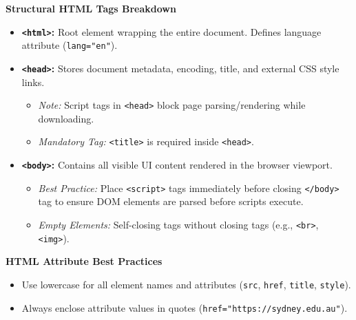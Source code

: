 \documentclass[8pt, a4paper]{article}
\begin{document}
\begin{conceptbox}
\textbf{Structural HTML Tags Breakdown}
\begin{itemize}
  \item \textbf{\texttt{<html>}:} Root element wrapping the entire document. Defines language attribute (\texttt{lang="en"}).
  \item \textbf{\texttt{<head>}:} Stores document metadata, encoding, title, and external CSS style links.
    \begin{itemize}
      \item \textit{Note:} Script tags in \texttt{<head>} block page parsing/rendering while downloading.
      \item \textit{Mandatory Tag:} \texttt{<title>} is required inside \texttt{<head>}.
    \end{itemize}
  \item \textbf{\texttt{<body>}:} Contains all visible UI content rendered in the browser viewport.
    \begin{itemize}
      \item \textit{Best Practice:} Place \texttt{<script>} tags immediately before closing \texttt{</body>} tag to
            ensure DOM elements are parsed before scripts execute.
      \item \textit{Empty Elements:} Self-closing tags without closing tags (e.g., \texttt{<br>}, \texttt{<img>}).
    \end{itemize}
\end{itemize}

\smallskip
\textbf{HTML Attribute Best Practices}
\begin{itemize}
  \item Use lowercase for all element names and attributes (\texttt{src}, \texttt{href}, \texttt{title}, \texttt{style}).
  \item Always enclose attribute values in quotes (\texttt{href="https://sydney.edu.au"}).
\end{itemize}
\end{conceptbox}
\end{document}
